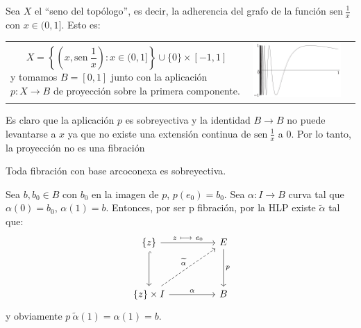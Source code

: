 \begin{ejem}
Sea $X$ el ``seno del topólogo'', es decir, la adherencia del grafo de la función $\text{sen}\: {\frac{1}{x}}$ con $x \in (0,1]$. Esto es: \par
\begin{tabular}{ll}
\begin{minipage}{0.5\textwidth}
\[ 
X = \left\lbrace \left(x, \text{sen}\: {\frac{1}{x}} \right) : x \in (0,1] \right\rbrace \cup \{0\} \times [-1,1] 
\]
y tomamos $B = [0,1]$ junto con la aplicación $p : X \longrightarrow B$ de proyección sobre la primera componente. \par
\end{minipage}
&
\begin{minipage}{0.5\textwidth}
\centering
\includegraphics[width =0.9\textwidth]{images/senotop}
\end{minipage}
\end{tabular}


Es claro que la aplicación $p$ es sobreyectiva y la identidad $B \longrightarrow B$ no puede levantarse a $x$ ya que no existe una extensión continua de $\text{sen}\: {\frac{1}{x}}$ a $0$. Por lo tanto, la proyección no es una fibración
\end{ejem}
\begin{prop}
Toda fibración con base arcoconexa es sobreyectiva.
\end{prop}
\begin{demo}
Sea $b, b_0 \in B$ con $b_0$ en la imagen de $p$, $p(e_0) = b_0$. Sea $\alpha : I \longrightarrow B$ curva tal que $\alpha(0) = b_0$, $\alpha(1) = b$. Entonces, por ser p fibración, por la HLP existe $\widetilde{\alpha}$ tal que:
\[
\begin{tikzcd}
\{z\} \arrow{rr}{z \ \longmapsto \ e_0} \arrow[hook]{dd} & & E \arrow{dd}{p} \\
\\
\{z\} \times I \arrow{rr}{\alpha} \arrow[dashed]{uurr}{\widetilde{\alpha}} & & B
\end{tikzcd}
\]
y obviamente $p \: \widetilde{\alpha}(1) = \alpha(1) = b$.
\end{demo}
